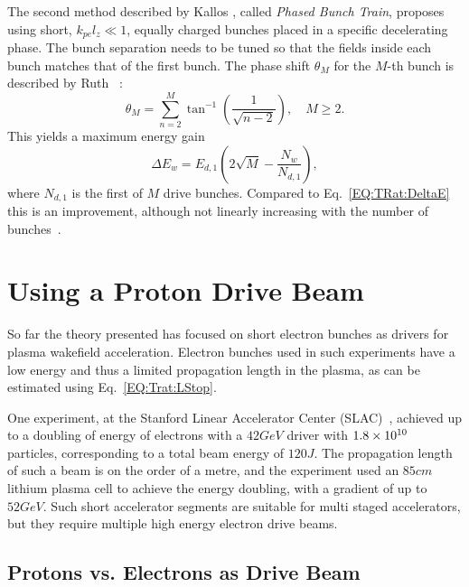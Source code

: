 The second method described by Kallos \etal, called \textit{Phased Bunch Train}, proposes using short, $k_{pe}l_{z} \ll 1$, equally charged bunches placed in a specific decelerating phase. The bunch separation needs to be tuned so that the fields inside each bunch matches that of the first bunch. The phase shift $\theta_{M}$ for the $M$-th bunch is described by Ruth \etal~\cite{ruth:1985}:
\begin{equation}
    \theta_{M} = \sum^{M}_{n=2}\tan^{-1}\left(\frac{1}{\sqrt{n-2}}\right),\quad M \geq 2. \label{EQ:TrainPhase}
\end{equation}
This yields a maximum energy gain
\begin{equation}
    \Delta E_{w} = E_{d,1}\left(2\sqrt{M}-\frac{N_{w}}{N_{d,1}}\right), \label{EQ:TrainPhaseMaxE}
\end{equation}
where $N_{d,1}$ is the first of $M$ drive bunches. Compared to Eq.~\ref{EQ:TRat:DeltaE} this is an improvement, although not linearly increasing with the number of bunches~\cite{ruth:1985}.

\section{Using a Proton Drive Beam}
\label{Int:DBeam}

So far the theory presented has focused on short electron bunches as drivers for plasma wakefield acceleration. Electron bunches used in such experiments have a low energy and thus a limited propagation length in the plasma, as can be estimated using Eq.~\ref{EQ:Trat:LStop}.

One experiment, at the Stanford Linear Accelerator Center (SLAC)~\cite{blumenfeld:2007}, achieved up to a doubling of energy of electrons with a $42\unit{GeV}$ driver with $1.8\times 10^{10}$ particles, corresponding to a total beam energy of $120\unit{J}$. The propagation length of such a beam is on the order of a metre, and the experiment used an $85\unit{cm}$ lithium plasma cell to achieve the energy doubling, with a gradient of up to $52\unit{GeV}$. Such short accelerator segments are suitable for multi staged accelerators, but they require multiple high energy electron drive beams. 

\subsection{Protons vs. Electrons as Drive Beam}
\label{Int:DBeam:PDPWFA}

